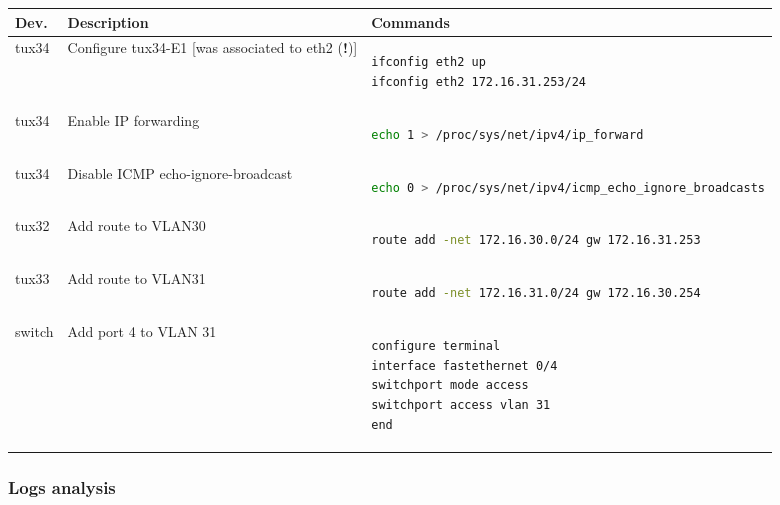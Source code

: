 \documentclass[a4paper, 11pt]{report}
\begin{document}
\begin{tabular}{l | p{43mm} | p{93mm}}
    \textbf{Dev.} & \textbf{Description}                                  & \textbf{Commands}                       \\ \hline
    tux34         & Configure tux34-E1 [was associated to eth2 (\textbf{!})] &
        \begin{lstlisting}[frame=none, numbers=none, language=sh, aboveskip=-0.5 \baselineskip, belowskip=-0.8 \baselineskip]
ifconfig eth2 up
ifconfig eth2 172.16.31.253/24
        \end{lstlisting} \\
    tux34         & Enable IP forwarding & 
    \begin{lstlisting}[frame=none, numbers=none, language=sh, aboveskip=-0.5 \baselineskip, belowskip=-0.8 \baselineskip]
echo 1 > /proc/sys/net/ipv4/ip_forward
    \end{lstlisting} \\
    tux34         & Disable ICMP echo-ignore-broadcast &  
    \begin{lstlisting}[frame=none, numbers=none, language=sh, aboveskip=-0.5 \baselineskip, belowskip=-0.8 \baselineskip]
echo 0 > /proc/sys/net/ipv4/icmp_echo_ignore_broadcasts
    \end{lstlisting} \\ \hline
    tux32         & Add route to VLAN30 &  
    \begin{lstlisting}[frame=none, numbers=none, language=sh, aboveskip=-0.5 \baselineskip, belowskip=-0.8 \baselineskip]
route add -net 172.16.30.0/24 gw 172.16.31.253
    \end{lstlisting} \\ \hline
    tux33         & Add route to VLAN31 &  
    \begin{lstlisting}[frame=none, numbers=none, language=sh, aboveskip=-0.5 \baselineskip, belowskip=-0.8 \baselineskip]
route add -net 172.16.31.0/24 gw 172.16.30.254
    \end{lstlisting} \\ \hline
    switch        & Add port 4 to VLAN 31 & 
    \begin{lstlisting}[frame=none, numbers=none, language=sh, aboveskip=-0.5 \baselineskip, belowskip=-0.8 \baselineskip]
configure terminal
interface fastethernet 0/4
switchport mode access
switchport access vlan 31
end
    \end{lstlisting}
\end{tabular}

\subsubsection{Logs analysis} \label{sec:Log3}
\end{document}

